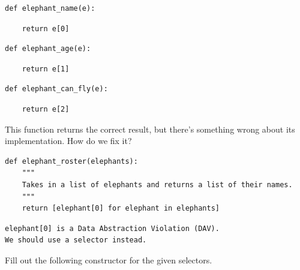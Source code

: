 \documentclass{exam}
\begin{document}
\begin{questions}
\begin{blocksection}
\begin{lstlisting}
def elephant_name(e):
\end{lstlisting}
\begin{solution}[1in]
\begin{lstlisting}
    return e[0]
\end{lstlisting}
\end{solution}

\begin{lstlisting}
def elephant_age(e):
\end{lstlisting}
\begin{solution}[1in]
\begin{lstlisting}
    return e[1]
\end{lstlisting}
\end{solution}

\begin{lstlisting}
def elephant_can_fly(e):
\end{lstlisting}
\begin{solution}[1in]
\begin{lstlisting}
    return e[2]
\end{lstlisting}
\end{solution}
\end{blocksection}


\begin{blocksection}
\question This function returns the correct result, but there's something wrong
about its implementation. How do we fix it?

\begin{lstlisting}
def elephant_roster(elephants):
    """
    Takes in a list of elephants and returns a list of their names.
    """
    return [elephant[0] for elephant in elephants]
\end{lstlisting}
\begin{solution}[1in]
\begin{lstlisting}[language=HTML]
elephant[0] is a Data Abstraction Violation (DAV).
We should use a selector instead.
\end{lstlisting}
\end{solution}

\end{blocksection}


\begin{blocksection}
\question Fill out the following constructor for the given selectors.


\end{blocksection}
\end{questions}
\end{document}
